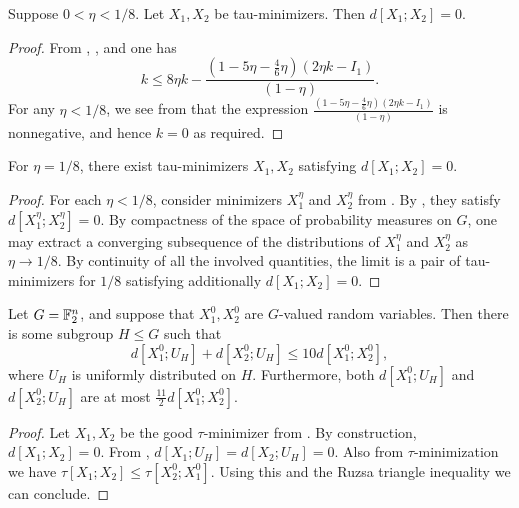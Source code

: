 \begin{theorem}\label{de-prop-improv}\leanok
Suppose $0 < \eta < 1/8$.  Let $X_1, X_2$ be tau-minimizers.  Then $d[X_1;X_2] = 0$.
\end{theorem}

\begin{proof}\leanok
From , , and  one has
  \[ k \leq 8\eta k - \frac{(1 -5 \eta - \frac{4}{6} \eta)(2 \eta k - I_1)}{(1-\eta)}.\]
  For any $\eta < 1/8$, we see from  that the expression $\frac{(1 -5 \eta - \frac{4}{6} \eta)(2 \eta k - I_1)}{(1-\eta)}$ is nonnegative, and hence $k = 0$ as required.
\end{proof}


\begin{theorem}\label{de-prop-lim-improv}\leanok
For $\eta = 1/8$, there exist tau-minimizers $X_1, X_2$ satisfying $d[X_1;X_2] = 0$.
\end{theorem}
\begin{proof}\leanok
For each $\eta<1/8$, consider minimizers $X_1^\eta$ and $X_2^\eta$ from .
By ,
they satisfy $d[X_1^\eta; X_2^\eta]=0$. By compactness of the space of probability measures
on $G$, one may extract a converging subsequence of the distributions of $X_1^\eta$ and $X_2^\eta$
as $\eta \to 1/8$. By continuity of all the involved quantities, the limit is a pair of
tau-minimizers for $1/8$ satisfying additionally $d[X_1;X_2] = 0$.
\end{proof}

\begin{theorem}\label{entropy-pfr-improv}\leanok
  Let $G = \mathbb{F}_2^n$, and suppose that $X^0_1, X^0_2$ are $G$-valued random variables.
  Then there is some subgroup $H \leq G$ such that
  \[
    d[X^0_1;U_H] + d[X^0_2;U_H] \le 10 d[X^0_1;X^0_2],
  \]
  where $U_H$ is uniformly distributed on $H$.
  Furthermore, both $d[X^0_1;U_H]$ and $d[X^0_2;U_H]$ are at most $\tfrac{11}{2} d[X^0_1;X^0_2]$.
\end{theorem}

\begin{proof} \leanok
Let $X_1, X_2$ be the good $\tau$-minimizer from . By construction, $d[X_1;X_2]=0$.
From , $d[X_1;U_H] = d[X_2; U_H] = 0$.  Also from $\tau$-minimization we have $\tau[X_1;X_2] \leq \tau[X^0_2;X^0_1]$.  Using this and the Ruzsa triangle inequality we can conclude.
\end{proof}


